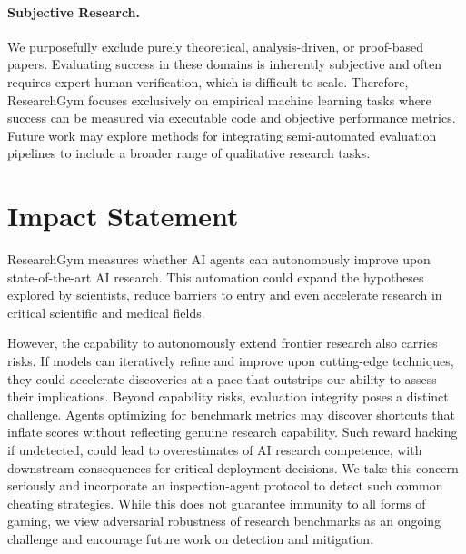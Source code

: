 \documentclass[11pt]{article}
\theoremstyle{plain}
\theoremstyle{definition}
\theoremstyle{remark}
\begin{document}
\paragraph{Subjective Research.} We purposefully exclude purely theoretical, analysis-driven, or proof-based papers. Evaluating success in these domains is inherently subjective and often requires expert human verification, which is difficult to scale. Therefore, ResearchGym focuses exclusively on empirical machine learning tasks where success can be measured via executable code and objective performance metrics. Future work may explore methods for integrating semi-automated evaluation pipelines to include a broader range of qualitative research tasks.





\section*{Impact Statement}

ResearchGym measures whether AI agents can autonomously improve upon state-of-the-art AI research. This automation could expand the hypotheses explored by scientists, reduce barriers to entry and even accelerate research in critical scientific and medical fields. 

However, the capability to autonomously extend frontier research also carries risks. If models can iteratively refine and improve upon cutting-edge techniques, they could accelerate discoveries at a pace that outstrips our ability to assess their implications. Beyond capability risks, evaluation integrity poses a distinct challenge. Agents optimizing for benchmark metrics may discover shortcuts that inflate scores without reflecting genuine research capability. Such reward hacking if undetected, could lead to overestimates of AI research competence, with downstream consequences for critical deployment decisions. We take this concern seriously and incorporate an inspection-agent protocol to detect such common cheating strategies. While this does not guarantee immunity to all forms of gaming, we view adversarial robustness of research benchmarks as an ongoing challenge and encourage future work on detection and mitigation.
\end{document}
